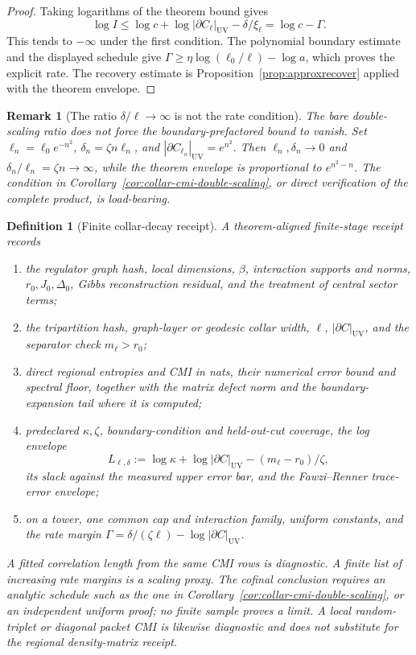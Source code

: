 \documentclass[11pt]{article}
\newtheorem{definition}[theorem]{Definition}
\newtheorem{remark}[theorem]{Remark}
\begin{document}
\begin{proof}
Taking logarithms of the theorem bound gives
\[
 \log I\le\log c+\log|\partial C_\ell|_{\mathrm{UV}}-\delta/\xi_\ell
 =\log c-\Gamma.
\]
This tends to \(-\infty\) under the first condition. The polynomial boundary estimate and the
displayed schedule give \(\Gamma\ge\eta\log(\ell_0/\ell)-\log a\), which proves the explicit rate.
The recovery estimate is Proposition~\ref{prop:approxrecover} applied with the theorem envelope.
\end{proof}

\begin{remark}[The ratio \(\delta/\ell\to\infty\) is not the rate condition]
\label{rem:collar-slow-double-scaling}
The bare double-scaling ratio does not force the boundary-prefactored bound to vanish. Set
\(\ell_n=\ell_0e^{-n^2}\), \(\delta_n=\zeta n\ell_n\), and
\(|\partial C_{\ell_n}|_{\mathrm{UV}}=e^{n^2}\). Then
\(\ell_n,\delta_n\to0\) and \(\delta_n/\ell_n=\zeta n\to\infty\), while the theorem envelope is
proportional to \(e^{n^2-n}\). The condition in Corollary~\ref{cor:collar-cmi-double-scaling}, or
direct verification of the complete product, is load-bearing.
\end{remark}

\begin{definition}[Finite collar-decay receipt]\label{def:finite-collar-decay-receipt}
A theorem-aligned finite-stage receipt records
\begin{enumerate}[label=\textup{R\arabic*.},leftmargin=2.4em]
\item the regulator graph hash, local dimensions, \(\beta\), interaction supports and norms,
      \(r_0,J_0,\Delta_0\), Gibbs reconstruction residual, and the treatment of central sector terms;
\item the tripartition hash, graph-layer or geodesic collar width, \(\ell\),
      \(|\partial C|_{\mathrm{UV}}\), and the separator check \(m_\ell>r_0\);
\item direct regional entropies and CMI in nats, their numerical error bound and spectral floor,
      together with the matrix defect norm and the boundary-expansion tail where it is computed;
\item predeclared \(\kappa,\zeta\), boundary-condition and held-out-cut coverage, the log envelope
\[
 L_{\ell,\delta}
 :=\log\kappa+\log|\partial C|_{\mathrm{UV}}
   -(m_\ell-r_0)/\zeta,
\]
      its slack against the measured upper error bar, and the Fawzi--Renner trace-error envelope;
\item on a tower, one common cap and interaction family, uniform constants, and the rate margin
      \(\Gamma=\delta/(\zeta\ell)-\log|\partial C|_{\mathrm{UV}}\).
\end{enumerate}
A fitted correlation length from the same CMI rows is diagnostic. A finite list of increasing
rate margins is a scaling proxy. The cofinal conclusion requires an analytic schedule such as the
one in Corollary~\ref{cor:collar-cmi-double-scaling}, or an independent uniform proof; no finite
sample proves a limit. A local random-triplet or diagonal packet CMI is likewise diagnostic and
does not substitute for the regional density-matrix receipt.
\end{definition}
\end{document}
